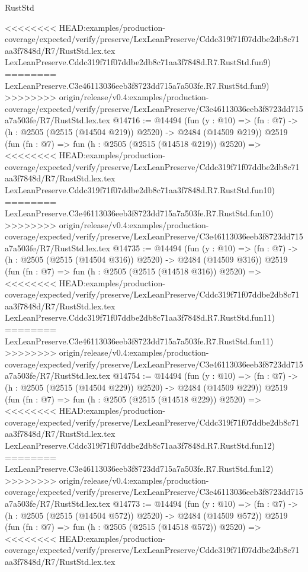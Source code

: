 \begin{lexlean}{RustStd}
\begin{coremodule}
{\begin{coremodule}
{{{{{{{{{{{{{{{{{{{{<<<<<<<< HEAD:examples/production-coverage/expected/verify/preserve/LexLeanPreserve/Cddc319f71f07ddbe2db8c71aa3f7848d/R7/RustStd.lex.tex
    LexLeanPreserve.Cddc319f71f07ddbe2db8c71aa3f7848d.R7.RustStd.fun9)
========
    LexLeanPreserve.C3e46113036eeb3f8723dd715a7a503fe.R7.RustStd.fun9)
>>>>>>>> origin/release/v0.4:examples/production-coverage/expected/verify/preserve/LexLeanPreserve/C3e46113036eeb3f8723dd715a7a503fe/R7/RustStd.lex.tex
@14716 := @14494
    (fun (y : @10) => (fn : @7) -> (h : @2505 (@2515 (@14504 @219)) @2520) -> @2484 (@14509 @219))
    @2519
    (fun (fn : @7) =>
    fun (h : @2505 (@2515 (@14518 @219)) @2520) =>
<<<<<<<< HEAD:examples/production-coverage/expected/verify/preserve/LexLeanPreserve/Cddc319f71f07ddbe2db8c71aa3f7848d/R7/RustStd.lex.tex
    LexLeanPreserve.Cddc319f71f07ddbe2db8c71aa3f7848d.R7.RustStd.fun10)
========
    LexLeanPreserve.C3e46113036eeb3f8723dd715a7a503fe.R7.RustStd.fun10)
>>>>>>>> origin/release/v0.4:examples/production-coverage/expected/verify/preserve/LexLeanPreserve/C3e46113036eeb3f8723dd715a7a503fe/R7/RustStd.lex.tex
@14735 := @14494
    (fun (y : @10) => (fn : @7) -> (h : @2505 (@2515 (@14504 @316)) @2520) -> @2484 (@14509 @316))
    @2519
    (fun (fn : @7) =>
    fun (h : @2505 (@2515 (@14518 @316)) @2520) =>
<<<<<<<< HEAD:examples/production-coverage/expected/verify/preserve/LexLeanPreserve/Cddc319f71f07ddbe2db8c71aa3f7848d/R7/RustStd.lex.tex
    LexLeanPreserve.Cddc319f71f07ddbe2db8c71aa3f7848d.R7.RustStd.fun11)
========
    LexLeanPreserve.C3e46113036eeb3f8723dd715a7a503fe.R7.RustStd.fun11)
>>>>>>>> origin/release/v0.4:examples/production-coverage/expected/verify/preserve/LexLeanPreserve/C3e46113036eeb3f8723dd715a7a503fe/R7/RustStd.lex.tex
@14754 := @14494
    (fun (y : @10) => (fn : @7) -> (h : @2505 (@2515 (@14504 @229)) @2520) -> @2484 (@14509 @229))
    @2519
    (fun (fn : @7) =>
    fun (h : @2505 (@2515 (@14518 @229)) @2520) =>
<<<<<<<< HEAD:examples/production-coverage/expected/verify/preserve/LexLeanPreserve/Cddc319f71f07ddbe2db8c71aa3f7848d/R7/RustStd.lex.tex
    LexLeanPreserve.Cddc319f71f07ddbe2db8c71aa3f7848d.R7.RustStd.fun12)
========
    LexLeanPreserve.C3e46113036eeb3f8723dd715a7a503fe.R7.RustStd.fun12)
>>>>>>>> origin/release/v0.4:examples/production-coverage/expected/verify/preserve/LexLeanPreserve/C3e46113036eeb3f8723dd715a7a503fe/R7/RustStd.lex.tex
@14773 := @14494
    (fun (y : @10) => (fn : @7) -> (h : @2505 (@2515 (@14504 @572)) @2520) -> @2484 (@14509 @572))
    @2519
    (fun (fn : @7) =>
    fun (h : @2505 (@2515 (@14518 @572)) @2520) =>
<<<<<<<< HEAD:examples/production-coverage/expected/verify/preserve/LexLeanPreserve/Cddc319f71f07ddbe2db8c71aa3f7848d/R7/RustStd.lex.tex
}}}}}}}}}}}}}}}}}}}}
\end{coremodule}}
\end{coremodule}
\end{lexlean}
